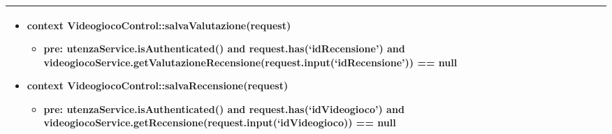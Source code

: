 \begin{tabular}{|| l | p{28.5em} ||}
\begin{itemize}[leftmargin=*]
	\item \textbf{context} VideogiocoControl::salvaValutazione(request)
	\begin{itemize}
		\item[ ] \textbf{pre:} utenzaService.isAuthenticated() and request.has(‘idRecensione’) and videogiocoService.getValutazioneRecensione(request.input(‘idRecensione’)) == null
	\end{itemize}

	\item \textbf{context} VideogiocoControl::salvaRecensione(request)
	\begin{itemize}
		\item[ ] \textbf{pre:} utenzaService.isAuthenticated() and request.has(‘idVideogioco’) and videogiocoService.getRecensione(request.input(‘idVideogioco)) == null
	\end{itemize}
\end{itemize}\\
\hline
\end{tabular}

\newpage
